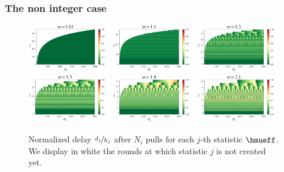 \subsubsection{The non integer case}
\begin{figure}[ht]
\centering
\includegraphics[clip, width= 0.325\textwidth]{2.1Rested/fig/T=5000_m=1,01.pdf}
\includegraphics[clip, width= 0.325\textwidth]{2.1Rested/fig/T=5000_m=1,1.pdf}
\includegraphics[clip, width= 0.325\textwidth]{2.1Rested/fig/T=5000_m=1,3.pdf}
\includegraphics[clip, width= 0.325\textwidth]{2.1Rested/fig/T=5000_m=1,5.pdf}
\includegraphics[clip, width= 0.325\textwidth]{2.1Rested/fig/T=5000_m=1,9.pdf}
\includegraphics[clip, width= 0.325\textwidth]{2.1Rested/fig/T=5000_m=2,1.pdf}
\caption{Normalized delay $\nicefrac{d_j}{h_j}$ after $N_i$ pulls for each $j$-th statistic $\hmueff$. We display in white the rounds at which statistic $j$ is not created yet.}
\label{fig:delay-general}
\end{figure}

